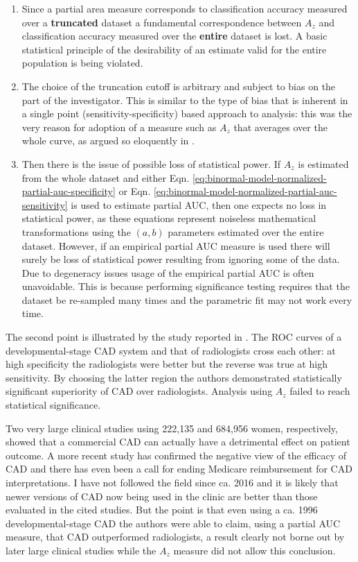 \documentclass[
]{book}
\begin{document}
\begin{enumerate}
\def\labelenumi{\arabic{enumi}.}
\item
  Since a partial area measure corresponds to classification accuracy measured over a \textbf{truncated} dataset a fundamental correspondence between \(A_z\) and classification accuracy measured over the \textbf{entire} dataset is lost. A basic statistical principle of the desirability of an estimate valid for the entire population is being violated.
\item
  The choice of the truncation cutoff is arbitrary and subject to bias on the part of the investigator. This is similar to the type of bias that is inherent in a single point (sensitivity-specificity) based approach to analysis: this was the very reason for adoption of a measure such as \(A_z\) that averages over the whole curve, as argued so eloquently in \citep{metz1978rocmethodology}.
\item
  Then there is the issue of possible loss of statistical power. If \(A_z\) is estimated from the whole dataset and either Eqn. \eqref{eq:binormal-model-normalized-partial-auc-specificity} or Eqn. \eqref{eq:binormal-model-normalized-partial-auc-sensitivity} is used to estimate partial AUC, then one expects no loss in statistical power, as these equations represent noiseless mathematical transformations using the \((a,b)\) parameters estimated over the entire dataset. However, if an empirical partial AUC measure is used there will surely be loss of statistical power resulting from ignoring some of the data. Due to degeneracy issues usage of the empirical partial AUC is often unavoidable. This is because performing significance testing requires that the dataset be re-sampled many times and the parametric fit may not work every time.
\end{enumerate}

The second point is illustrated by the study reported in \citep{jiang1996receiver}. The ROC curves of a developmental-stage CAD system and that of radiologists cross each other: at high specificity the radiologists were better but the reverse was true at high sensitivity. By choosing the latter region the authors demonstrated statistically significant superiority of CAD over radiologists. Analysis using \(A_z\) failed to reach statistical significance.

Two very large clinical studies \citep[\citet{fenton2011effectiveness}]{fenton2007influence} using 222,135 and 684,956 women, respectively, showed that a commercial CAD can actually have a detrimental effect on patient outcome\citep{philpotts2009can}. A more recent study has confirmed the negative view of the efficacy of CAD\citep{lehman2015diagnostic} and there has even been a call for ending Medicare reimbursement for CAD interpretations\citep{fenton2015time}. I have not followed the field since ca. 2016 and it is likely that newer versions of CAD now being used in the clinic are better than those evaluated in the cited studies. But the point is that even using a ca. 1996 developmental-stage CAD the authors were able to claim, using a partial AUC measure, that CAD outperformed radiologists, a result clearly not borne out by later large clinical studies while the \(A_z\) measure did not allow this conclusion.
\end{document}
